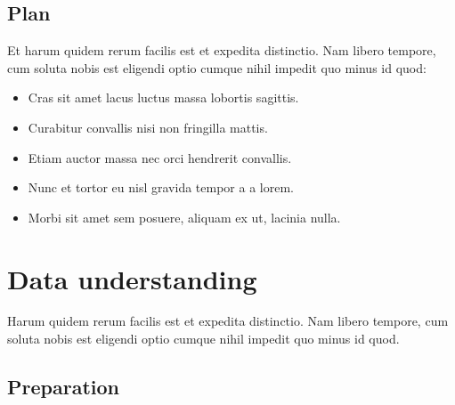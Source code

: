 \hypertarget{plan}{%
\subsection{Plan}\label{plan}}

Et harum quidem rerum facilis est et expedita distinctio. Nam libero
tempore, cum soluta nobis est eligendi optio cumque nihil impedit quo
minus id quod:

\begin{itemize}
\tightlist
\item
  Cras sit amet lacus luctus massa lobortis sagittis.
\item
  Curabitur convallis nisi non fringilla mattis.
\item
  Etiam auctor massa nec orci hendrerit convallis.
\item
  Nunc et tortor eu nisl gravida tempor a a lorem.
\item
  Morbi sit amet sem posuere, aliquam ex ut, lacinia nulla.
\end{itemize}

\hypertarget{data-understanding}{%
\section{Data understanding}\label{data-understanding}}

Harum quidem rerum facilis est et expedita distinctio. Nam libero
tempore, cum soluta nobis est eligendi optio cumque nihil impedit quo
minus id quod.

\hypertarget{preparation}{%
\subsection{Preparation}\label{preparation}}

